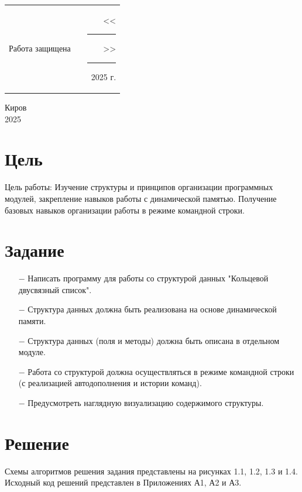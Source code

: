 \documentclass[oneside,a4paper,14pt]{extarticle}
\begin{document}
\noindent
\begin{tabular}{lp{58mm}r}
	Работа защищена &  & <<\rule[-1mm]{5mm}{0.10mm}\/>>\rule[-1mm]{30mm}{0.10mm}\ 2025 г.
\end{tabular}
\vfill

\begin{center}
	Киров\\
	2025
\end{center}

\newpage\thispagestyle{plain}

\section*{Цель}

Цель работы: Изучение структуры и принципов организации программных модулей, закрепление навыков работы с динамической памятью. Получение базовых навыков организации работы в режиме командной строки.

\section*{Задание}
\begin{itemize}
	\item[$-$] Написать программу для работы со структурой данных "Кольцевой двусвязный список".
	\item[$-$] Структура данных должна быть реализована на основе динамической памяти.
	\item[$-$] Структура данных (поля и методы) должна быть описана в отдельном модуле.
	\item[$-$] Работа со структурой должна осуществляться в режиме командной строки (с реализацией автодополнения и истории команд).
	\item[$-$] Предусмотреть наглядную визуализацию содержимого структуры.
\end{itemize}

\section*{Решение}

Схемы алгоритмов решения задания представлены на рисунках 1.1, 1.2, 1.3 и 1.4. Исходный код решений представлен в Приложениях А1, А2 и А3.
\end{document}
